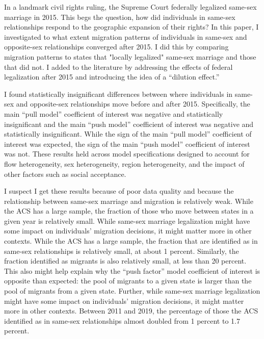\documentclass[12pt,letterpaper]{article}
\begin{document}
In a landmark civil rights ruling, the Supreme Court federally legalized same-sex marriage in 2015. This begs the question, how did individuals in same-sex relationships respond to the geographic expansion of their rights? In this paper, I investigated to what extent migration patterns of individuals in same-sex and opposite-sex relationships converged after 2015. I did this by comparing migration patterns to states that "locally legalized" same-sex marriage and those that did not. I added to the literature by addressing the effects of federal legalization after 2015 and introducing the idea of a “dilution effect.”

I found statistically insignificant differences between where individuals in same-sex and opposite-sex relationships move before and after 2015. Specifically, the main “pull model” coefficient of interest was negative and statistically insignificant and the main “push model” coefficient of interest was negative and statistically insignificant. While the sign of the main “pull model” coefficient of interest was expected, the sign of the main “push model” coefficient of interest was not. These results held across model specifications designed to account for flow heterogeneity, sex heterogeneity, region heterogeneity, and the impact of other factors such as social acceptance. 

I suspect I get these results because of poor data quality and because the relationship between same-sex marriage and migration is relatively weak. While the ACS has a large sample, the fraction of those who move between states in a given year is relatively small. While same-sex marriage legalization might have some impact on individuals’ migration decisions, it might matter more in other contexts. While the ACS has a large sample, the fraction that are identified as in same-sex relationships is relatively small, at about 1 percent. Similarly, the fraction identified as migrants is also relatively small, at less than 20 percent. This also might help explain why the “push factor” model coefficient of interest is opposite than expected: the pool of migrants to a given state is larger than the pool of migrants from a given state. Further, while same-sex marriage legalization might have some impact on individuals’ migration decisions, it might matter more in other contexts. Between 2011 and 2019, the percentage of those the ACS identified as in same-sex relationships almost doubled from 1 percent to 1.7 percent.
\end{document}
